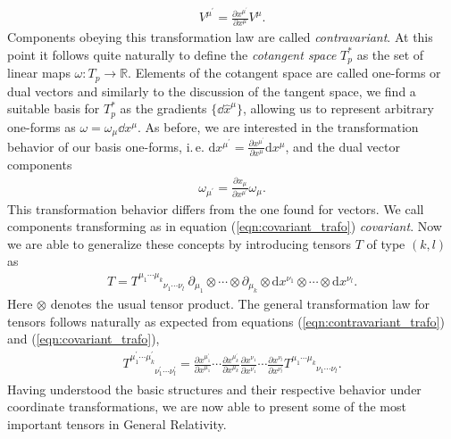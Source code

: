 \begin{align}
	V^{\mu^{\prime}}=\frac{\partial x^{\mu^{\prime}}}{\partial x^{\mu}} V^{\mu}. \label{eqn:contravariant_trafo}
\end{align}
Components obeying this transformation law are called \textit{contravariant}. At this point it follows quite naturally to define the \textit{cotangent space} $T_p^*$ as the set of linear maps $\omega: T_p \rightarrow \mathbb{R}$. Elements of the cotangent space are called one-forms or dual vectors and similarly to the discussion of the tangent space, we find a suitable basis for $T_p^*$ as the gradients $\{\dd\hat{x}^{\mu}\}$, allowing us to represent arbitrary one-forms as $\omega = \omega_{\mu} \dd x^{\mu}$. As before, we are interested in the transformation behavior of our basis one-forms, i.\,e. $\mathrm{d} x^{\mu^{\prime}}=\frac{\partial x^{\mu^{\prime}}}{\partial x^{\mu}} \mathrm{d} x^{\mu}$, and the dual vector components
\begin{align}
	\omega_{\mu^{\prime}}=\frac{\partial x_{\mu}}{\partial x^{\mu^{\prime}}} \omega_{\mu}.\label{eqn:covariant_trafo}
\end{align}
This transformation behavior differs from the one found for vectors. We call components transforming as in equation (\ref{eqn:covariant_trafo}) \textit{covariant}.
Now we are able to generalize these concepts by introducing tensors $T$ of type $(k,l)$ as
\begin{align}
T=T_{\phantom{\mu_{1} \cdots \mu_{k}}\nu_{1} \cdots \nu_{l}}^{\mu_{1} \cdots \mu_{k}} \ \partial_{\mu_{1}} \otimes \cdots \otimes \partial_{\mu_{k}} \otimes \mathrm{d} x^{\nu_{1}} \otimes \cdots \otimes \mathrm{d} x^{\nu_{l}}.
\end{align}
Here $\otimes$ denotes the usual tensor product.
The general transformation law for tensors follows naturally as expected from equations (\ref{eqn:contravariant_trafo}) and (\ref{eqn:covariant_trafo}),
\begin{align}
	T_{\phantom{\mu_{1}^{\prime} \cdots \mu_{k}^{\prime}}\nu_{1}^{\prime} \cdots \nu_{l}^{\prime}}^{\mu_{1}^{\prime} \cdots \mu_{k}^{\prime}}=\frac{\partial x^{\mu_{1}^{\prime}}}{\partial x^{\mu_{1}}} \cdots \frac{\partial x^{\mu_{k}^{\prime}}}{\partial x^{\mu_{k}}} \frac{\partial x^{\nu_{1}}}{\partial x^{\nu_{1}^{\prime}}} \cdots \frac{\partial x^{\nu_{l}}}{\partial x^{\nu_{l}^{\prime}}} T^{\mu_{1} \cdots \mu_{k}}_{\phantom{\mu_{1} \cdots \mu_{k}}\nu_{1} \cdots \nu_{l}}.
\end{align}
Having understood the basic structures and their respective behavior under coordinate transformations, we are now able to present some of the most important tensors in General Relativity. \\
